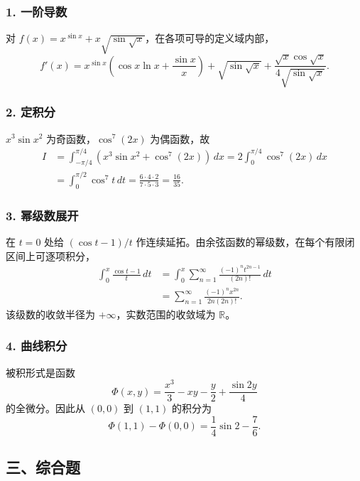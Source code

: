 \documentclass[11pt,fontset=fandol]{ctexart}
\begin{document}
\subsubsection{1. 一阶导数}\label{ux4e00ux9636ux5bfcux6570}

对 \(f(x)=x^{\sin x}+x\sqrt{\sin\sqrt{x}}\)，在各项可导的定义域内部， \[
\boxed{f'(x)=x^{\sin x}\left(\cos x\ln x+\frac{\sin x}{x}\right)
+\sqrt{\sin\sqrt{x}}
+\frac{\sqrt{x}\cos\sqrt{x}}{4\sqrt{\sin\sqrt{x}}}.}
\]

\subsubsection{2. 定积分}\label{ux5b9aux79efux5206-1}

\(x^3\sin x^2\) 为奇函数，\(\cos^7(2x)\) 为偶函数，故 \[
\begin{aligned}
I&=\int_{-\pi/4}^{\pi/4}(x^3\sin x^2+\cos^7(2x))\,dx
=2\int_0^{\pi/4}\cos^7(2x)\,dx\\
&=\int_0^{\pi/2}\cos^7t\,dt
=\frac{6\cdot4\cdot2}{7\cdot5\cdot3}=\boxed{\frac{16}{35}}.
\end{aligned}
\]

\subsubsection{3. 幂级数展开}\label{ux5e42ux7ea7ux6570ux5c55ux5f00}

在 \(t=0\) 处给 \((\cos t-1)/t\)
作连续延拓。由余弦函数的幂级数，在每个有限闭区间上可逐项积分， \[
\begin{aligned}
\int_0^x\frac{\cos t-1}{t}\,dt
&=\int_0^x\sum_{n=1}^{\infty}\frac{(-1)^nt^{2n-1}}{(2n)!}\,dt\\
&=\boxed{\sum_{n=1}^{\infty}\frac{(-1)^nx^{2n}}{2n(2n)!}}.
\end{aligned}
\] 该级数的收敛半径为 \(+\infty\)，实数范围的收敛域为 \(\mathbb R\)。

\subsubsection{4. 曲线积分}\label{ux66f2ux7ebfux79efux5206}

被积形式是函数 \[
\Phi(x,y)=\frac{x^3}{3}-xy-\frac y2+\frac{\sin2y}{4}
\] 的全微分。因此从 \((0,0)\) 到 \((1,1)\) 的积分为 \[
\boxed{\Phi(1,1)-\Phi(0,0)=\frac14\sin2-\frac76.}
\]

\subsection{三、综合题}\label{ux4e09ux7efcux5408ux9898}
\end{document}
